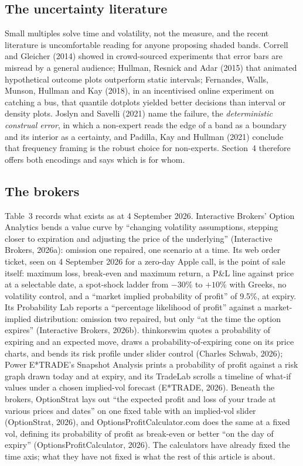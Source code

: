 \documentclass[11pt,a4paper]{article}
\begin{document}
\subsection{The uncertainty literature}

Small multiples solve time and volatility, not the measure, and the recent literature is uncomfortable reading for anyone proposing shaded bands. Correll and Gleicher (2014) showed in crowd-sourced experiments that error bars are misread by a general audience; Hullman, Resnick and Adar (2015) that animated hypothetical outcome plots outperform static intervals; Fernandes, Walls, Munson, Hullman and Kay (2018), in an incentivised online experiment on catching a bus, that quantile dotplots yielded better decisions than interval or density plots. Joslyn and Savelli (2021) name the failure, the \emph{deterministic construal error}, in which a non-expert reads the edge of a band as a boundary and its interior as a certainty, and Padilla, Kay and Hullman (2021) conclude that frequency framing is the robust choice for non-experts. Section~4 therefore offers both encodings and says which is for whom.

\subsection{The brokers}

Table~3 records what exists as at 4 September 2026. Interactive Brokers' Option Analytics bends a value curve by ``changing volatility assumptions, stepping closer to expiration and adjusting the price of the underlying'' (Interactive Brokers, 2026a): omission one repaired, one scenario at a time. Its web order ticket, seen on 4 September 2026 for a zero-day Apple call, is the point of sale itself: maximum loss, break-even and maximum return, a P\&L line against price at a selectable date, a spot-shock ladder from $-30\%$ to $+10\%$ with Greeks, no volatility control, and a ``market implied probability of profit'' of 9.5\%, at expiry. Its Probability Lab reports a ``percentage likelihood of profit'' against a market-implied distribution: omission two repaired, but only ``at the time the option expires'' (Interactive Brokers, 2026b). thinkorswim quotes a probability of expiring and an expected move, draws a probability-of-expiring cone on its price charts, and bends its risk profile under slider control (Charles Schwab, 2026); Power E*TRADE's Snapshot Analysis prints a probability of profit against a risk graph drawn today and at expiry, and its TradeLab scrolls a timeline of what-if values under a chosen implied-vol forecast (E*TRADE, 2026). Beneath the brokers, OptionStrat lays out ``the expected profit and loss of your trade at various prices and dates'' on one fixed table with an implied-vol slider (OptionStrat, 2026), and OptionsProfitCalculator.com does the same at a fixed vol, defining its probability of profit as break-even or better ``on the day of expiry'' (OptionsProfitCalculator, 2026). The calculators have already fixed the time axis; what they have not fixed is what the rest of this article is about.
\end{document}
